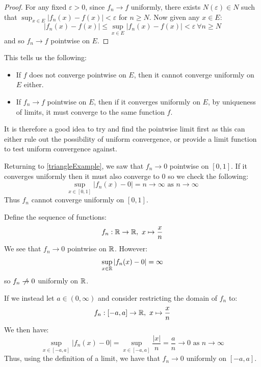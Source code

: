 \documentclass[../main.tex]{subfiles}
\begin{document}
\begin{proof}
  For any fixed $\varepsilon > 0$, since $f_n \to f$ uniformly, there exists $N(\varepsilon) \in N$ such that $\sup_{x \in E} |f_n(x) - f(x)| < \varepsilon$ for $n \geq N$.
  Now given any $x \in E$:
  \[
    |f_n(x) - f(x)| \leq \sup_{x \in E} |f_n(x) - f(x)| < \varepsilon\ \forall n \geq N
  \]
  and so $f_n \to f$ pointwise on $E$.
\end{proof}
\begin{remark}
  This tells us the following:
  \begin{itemize}
    \item If $f$ does not converge pointwise on $E$, then it cannot converge uniformly on $E$ either.
    \item If $f_n \to f$ pointwise on $E$, then if it converges uniformly on $E$, by uniqueness of limits, it must converge to the same function $f$.
  \end{itemize}
  It is therefore a good idea to try and find the pointwise limit first as this can either rule out the possibility of uniform convergence, or provide a limit function to test uniform convergence against.
\end{remark}
\begin{example}
  Returning to \cref{triangleExample}, we saw that $f_n \to 0$ pointwise on $[0, 1]$.
  If it converges uniformly then it must also converge to $0$ so we check the following:
  \[
    \sup_{x \in [0, 1]} |f_n(x) - 0| = n \to \infty \text{ as $n \to \infty$}
  \]
  Thus $f_n$ cannot converge uniformly on $[0, 1]$.
\end{example}
\begin{example}
  Define the sequence of functions:
  \[
    f_n: \mathbb{R} \to \mathbb{R},\ x \mapsto \frac{x}{n}
  \]
  We see that $f_n \to 0$ pointwise on $\mathbb{R}$.
  However:
  \[
    \sup_{x \in \mathbb{R}} |f_n(x) - 0| = \infty
  \]
  so $f_n \centernot\to 0$ uniformly on $\mathbb{R}$.

  If we instead let $a \in (0, \infty)$ and consider restricting the domain of $f_n$ to:
  \[
    f_n: [-a, a] \to \mathbb{R},\ x \mapsto \frac{x}{n}
  \]
  We then have:
  \[
    \sup_{x \in [-a, a]} |f_n(x) - 0| = \sup_{x \in [-a, a]} \frac{|x|}{n} = \frac{a}{n} \to 0 \text{ as $n \to \infty$}
  \]
  Thus, using the definition of a limit, we have that $f_n \to 0$ uniformly on $[-a, a]$.
\end{example}
\end{document}
